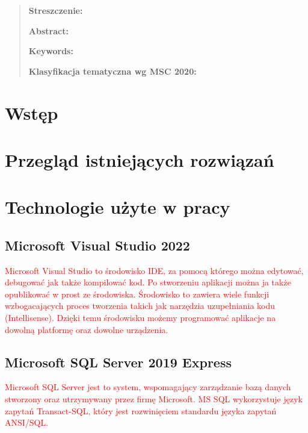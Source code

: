 \documentclass[12pt,twoside]{report}
\begin{document}
	\begin{quote}{\small 
			\noindent
			
			\bigskip
			\noindent
			\textbf{Streszczenie:} 
			
			
			\noindent
			\newline
			\textbf{}
			\vspace{5pt}
			
			\noindent
			\newline
			\textbf{Abstract:} 
			\vspace{5pt}
			
			\vspace{5pt}
			\noindent
			\newline
			\textbf{Keywords:} 
			\vspace{5pt}
			\bigskip
			
			\noindent 
			\textbf{Klasyfikacja tematyczna wg  MSC 2020:}}
	\end{quote}

	\mbox{}
	
	\pagestyle{plain}
	\tableofcontents
	\thispagestyle{empty}
	
	
	\newpage
	\setcounter{page}{1}
	\newpage
\chapter{Wstęp}
\chapter{Przegląd istniejących rozwiązań}
\chapter{Technologie użyte w pracy}
\section{Microsoft Visual Studio 2022}
\textcolor{red} {Microsoft Visual Studio to środowisko IDE, za pomocą którego można edytować, debugować jak także kompilować kod. Po stworzeniu aplikacji można ja także opublikować w prost ze środowiska. Środowisko to zawiera wiele funkcji wzbogacających proces tworzenia takich jak narzędzia uzupełniania kodu (Intellisense). Dzięki temu środowisku możemy programować aplikacje na dowolną platformę oraz dowolne urządzenia. }
\section{Microsoft SQL Server 2019 Express}
\textcolor{red} {Microsoft SQL Server jest to system, wspomagający zarządzanie bazą danych stworzony oraz utrzymywany przez firmę Microsoft. MS SQL wykorzystuje język zapytań Transact-SQL, który jest rozwinięciem standardu języka zapytań ANSI/SQL.}
\end{document}
